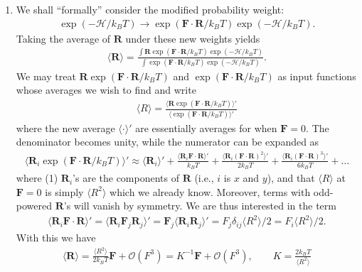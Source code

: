 \documentclass{article}
\theoremstyle{definition}
\newcommand{\ham}{\mathcal{H}}
\newcommand{\f}[2]{\frac{#1}{#2}}
\begin{document}
\begin{enumerate}[label=(\alph*)]
	\item We shall ``formally'' consider the modified probability weight: 
	\begin{align*}
	\exp(-\ham /k_BT) \to \exp(\mathbf{F}\cdot \mathbf{R} /k_BT) \exp(-\ham /k_BT).
	\end{align*} 
	Taking the average of $\mathbf{R}$ under these new weights yields
	\begin{align*}
	\langle \mathbf{R} \rangle = \f{\int \mathbf{R} \exp(\mathbf{F}\cdot \mathbf{R} /k_BT) \exp(-\ham /k_BT) }{\int \exp(\mathbf{F}\cdot \mathbf{R} /k_BT) \exp(-\ham /k_BT)}.
	\end{align*}
	We may treat $\mathbf{R}\exp(\mathbf{F}\cdot\mathbf{R}/k_BT)$ and $\exp(\mathbf{F}\cdot \mathbf{R}/k_BT)$ as input functions whose averages we wish to find and write
	\begin{align*}
	\langle R \rangle = \f{\langle \mathbf{R} \exp(\mathbf{F}\cdot \mathbf{R}/k_BT) \rangle' }{\langle \exp(\mathbf{F}\cdot \mathbf{R}/k_BT) \rangle' }
	\end{align*}
	where the new average $\langle \cdot \rangle'$ are essentially averages for when $\mathbf{F} = 0$. The denominator becomes unity, while the numerator can be expanded as
	\begin{align*}
	\langle \mathbf{R}_i \exp(\mathbf{F}\cdot \mathbf{R}/k_BT)\rangle' \approx \langle \mathbf{R}_i \rangle' 
	+ \f{\langle \mathbf{R}_i \mathbf{F}\cdot \mathbf{R}\rangle'}{k_BT} + \f{\langle \mathbf{R}_i (\mathbf{F}\cdot \mathbf{R})^2 \rangle' }{2k_BT} + \f{\langle \mathbf{R}_i(\mathbf{F}\cdot \mathbf{R})^3\rangle'}{6k_BT} + \dots 
	\end{align*}
	where (1) $\mathbf{R}_i$'s are the components of $\mathbf{R}$ (i.e., $i$ is $x$ and $y$), and that $\langle R \rangle$ at $\mathbf{F} =0$ is simply $\langle R^2\rangle$ which we already know. Moreover, terms with odd-powered $\mathbf{R}$'s will vanish by symmetry. We are thus interested in the term 
	\begin{align*}
	\langle \mathbf{R}_i \mathbf{F}\cdot \mathbf{R}\rangle' = \langle \mathbf{R}_i \mathbf{F}_j \mathbf{R}_j\rangle' = \mathbf{F}_j \langle \mathbf{R}_i \mathbf{R}_j \rangle' = F_j \delta_{ij} \langle R^2 \rangle /2 = F_i \langle R^2 \rangle/2.
	\end{align*}
	With this we have
	\begin{align*}
	\boxed{\langle \mathbf{R} \rangle = \f{\langle R^2 \rangle}{2k_BT} \mathbf{F} + \mathcal{O}(F^3) = K^{-1} \mathbf{F} + \mathcal{O}(F^3) , \quad\quad K = \f{2k_B T}{\langle R^2 \rangle}}
	\end{align*}
\end{enumerate}
\end{document}
